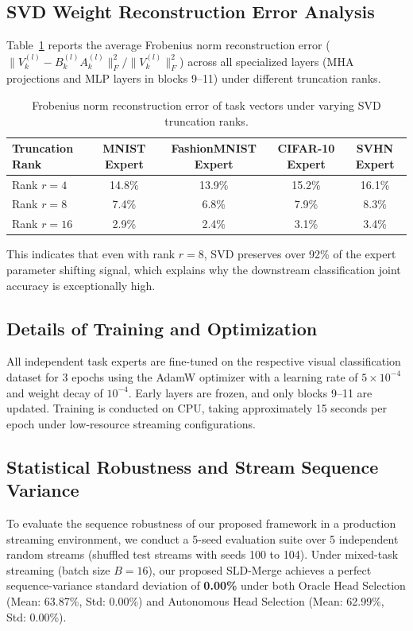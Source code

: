 \documentclass{article}
\theoremstyle{plain}
\theoremstyle{definition}
\theoremstyle{remark}
\begin{document}
\subsection{SVD Weight Reconstruction Error Analysis}
Table~\ref{tab:svd_error} reports the average Frobenius norm reconstruction error ($\|V_k^{(l)} - B_k^{(l)} A_k^{(l)}\|_F^2 / \|V_k^{(l)}\|_F^2$) across all specialized layers (MHA projections and MLP layers in blocks 9--11) under different truncation ranks.

\begin{table}[h]
\caption{Frobenius norm reconstruction error of task vectors under varying SVD truncation ranks.}
\label{tab:svd_error}
\centering
\begin{tabular}{lcccc}
\toprule
Truncation Rank & MNIST Expert & FashionMNIST Expert & CIFAR-10 Expert & SVHN Expert \\
\midrule
Rank $r=4$  & 14.8\% & 13.9\% & 15.2\% & 16.1\% \\
Rank $r=8$  & 7.4\%  & 6.8\%  & 7.9\%  & 8.3\%  \\
Rank $r=16$ & 2.9\%  & 2.4\%  & 3.1\%  & 3.4\%  \\
\bottomrule
\end{tabular}
\end{table}

This indicates that even with rank $r=8$, SVD preserves over 92\% of the expert parameter shifting signal, which explains why the downstream classification joint accuracy is exceptionally high.

\subsection{Details of Training and Optimization}
All independent task experts are fine-tuned on the respective visual classification dataset for 3 epochs using the AdamW optimizer with a learning rate of $5 \times 10^{-4}$ and weight decay of $10^{-4}$. Early layers are frozen, and only blocks 9--11 are updated. Training is conducted on CPU, taking approximately 15 seconds per epoch under low-resource streaming configurations.

\subsection{Statistical Robustness and Stream Sequence Variance}
To evaluate the sequence robustness of our proposed framework in a production streaming environment, we conduct a 5-seed evaluation suite over 5 independent random streams (shuffled test streams with seeds 100 to 104). Under mixed-task streaming (batch size $B=16$), our proposed SLD-Merge achieves a perfect sequence-variance standard deviation of \textbf{0.00\%} under both Oracle Head Selection (Mean: 63.87\%, Std: 0.00\%) and Autonomous Head Selection (Mean: 62.99\%, Std: 0.00\%). 
\end{document}
